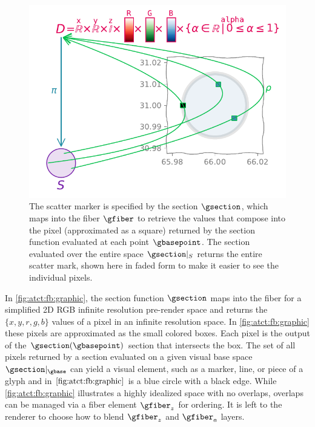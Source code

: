 \documentclass[review]{vgtc}
\theoremstyle{definition}
\theoremstyle{remark}
\begin{document}
\begin{figure}[]
  \includegraphics[width=1\columnwidth]{fb_rho.pdf}
  \caption{The scatter marker is specified by the section $\gsection$, which maps into the fiber $\gfiber$ to retrieve the values that compose into the pixel (approximated as a square) returned by the section function evaluated at each point $\gbasepoint$. The section evaluated over the entire space $\gsection\vert_{S}$ returns the entire scatter mark, shown here in faded form to make it easier to see the individual pixels.
  \label{fig:atct:fb:graphic}}
\end{figure}

In \autoref{fig:atct:fb:graphic}, the section function $\gsection$ maps into the fiber for a simplified 2D RGB infinite resolution pre-render space and returns the $\{x,y,r,g,b\}$ values of a pixel in an infinite resolution space. In \autoref{fig:atct:fb:graphic} these pixels are approximated as the small colored boxes. Each pixel is the output of the $\gsection(\gbasepoint)$ section that intersects the box. The set of all pixels returned by a section evaluated on a given visual base space $\gsection|_{\gbase}$ can yield a visual element, such as a marker, line, or piece of a glyph and in $\autoref{fig:atct:fb:graphic}$ is a blue circle with a black edge. While \autoref{fig:atct:fb:graphic} illustrates a highly idealized space with no overlaps, overlaps can be managed via a fiber element $\gfiber_{z}$ for ordering. It is left to the renderer to choose how to blend $\gfiber_{z}$ and $\gfiber_{a}$ layers.
\end{document}
